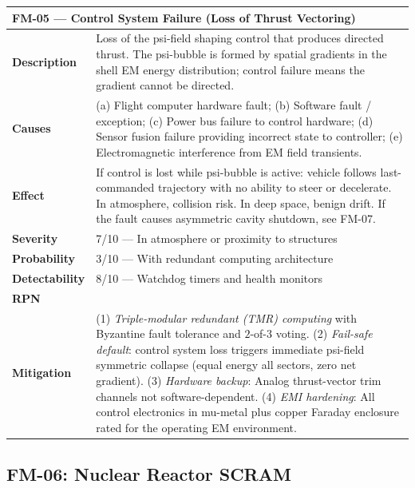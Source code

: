 \documentclass[11pt,a4paper]{article}
\newcommand{\Smed}[1]{\cellcolor{risk-medium!40}{#1}}
\begin{document}
\begin{longtable}{p{0.25\tw}p{0.65\tw}}
\toprule
\multicolumn{2}{l}{\textbf{FM-05 --- Control System Failure (Loss of Thrust Vectoring)}} \\
\midrule
\endhead
\textbf{Description} &
  Loss of the psi-field shaping control that produces directed thrust.
  The psi-bubble is formed by spatial gradients in the shell EM energy
  distribution; control failure means the gradient cannot be directed. \\[4pt]
\textbf{Causes} &
  (a) Flight computer hardware fault; (b) Software fault / exception;
  (c) Power bus failure to control hardware; (d) Sensor fusion failure
  providing incorrect state to controller; (e) Electromagnetic
  interference from EM field transients. \\[4pt]
\textbf{Effect} &
  If control is lost while psi-bubble is active: vehicle follows
  last-commanded trajectory with no ability to steer or decelerate.
  In atmosphere, collision risk. In deep space, benign drift.
  If the fault causes asymmetric cavity shutdown, see FM-07. \\[4pt]
\textbf{Severity} & 7/10 --- In atmosphere or proximity to structures \\[4pt]
\textbf{Probability} & 3/10 --- With redundant computing architecture \\[4pt]
\textbf{Detectability} & 8/10 --- Watchdog timers and health monitors \\[4pt]
\textbf{RPN} & \Smed{$7 \times 3 \times (11-8) = 63$} \\[4pt]
\textbf{Mitigation} &
  (1) \textit{Triple-modular redundant (TMR) computing} with Byzantine
  fault tolerance and $2$-of-$3$ voting. (2) \textit{Fail-safe default}:
  control system loss triggers immediate psi-field symmetric collapse
  (equal energy all sectors, zero net gradient). (3) \textit{Hardware
  backup}: Analog thrust-vector trim channels not software-dependent.
  (4) \textit{EMI hardening}: All control electronics in mu-metal plus
  copper Faraday enclosure rated for the operating EM environment. \\
\bottomrule
\end{longtable}

\subsection{FM-06: Nuclear Reactor SCRAM}
\end{document}
